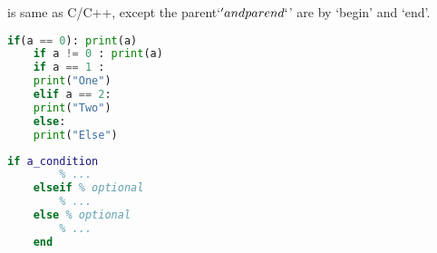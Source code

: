 
 is same as C/C++, except the parent`\(' and parend`\)' are by `begin' and `end'.


\begin{lstlisting}[language=Python]
	if(a == 0): print(a)
	if a != 0 : print(a)
	if a == 1 :
	print("One")
	elif a == 2:
	print("Two")
	else:
	print("Else")
\end{lstlisting}

\begin{lstlisting}[language=MATLAB]
	if a_condition
		% ...
	elseif % optional
		% ...
	else % optional
		% ...
	end
\end{lstlisting}


